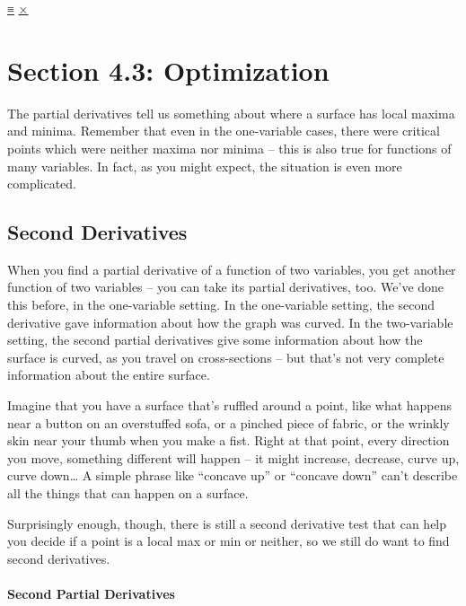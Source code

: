 \protect\hyperlink{main-nav}{≡} \protect\hyperlink{close-nav}{×}

\hypertarget{section-4.3-optimization}{%
\section{Section 4.3: Optimization}\label{section-4.3-optimization}}

The partial derivatives tell us something about where a surface has
local maxima and minima. Remember that even in the one-variable cases,
there were critical points which were neither maxima nor minima -- this
is also true for functions of many variables. In fact, as you might
expect, the situation is even more complicated.

\hypertarget{second-derivatives}{%
\subsection{Second Derivatives}\label{second-derivatives}}

When you find a partial derivative of a function of two variables, you
get another function of two variables -- you can take its partial
derivatives, too. We've done this before, in the one-variable setting.
In the one-variable setting, the second derivative gave information
about how the graph was curved. In the two-variable setting, the second
partial derivatives give some information about how the surface is
curved, as you travel on cross-sections -- but that's not very complete
information about the entire surface.

Imagine that you have a surface that's ruffled around a point, like what
happens near a button on an overstuffed sofa, or a pinched piece of
fabric, or the wrinkly skin near your thumb when you make a fist. Right
at that point, every direction you move, something different will happen
-- it might increase, decrease, curve up, curve down\ldots{} A simple
phrase like ``concave up'' or ``concave down'' can't describe all the
things that can happen on a surface.

Surprisingly enough, though, there is still a second derivative test
that can help you decide if a point is a local max or min or neither, so
we still do want to find second derivatives.

\hypertarget{second-partial-derivatives}{%
\paragraph{Second Partial
Derivatives}\label{second-partial-derivatives}}

